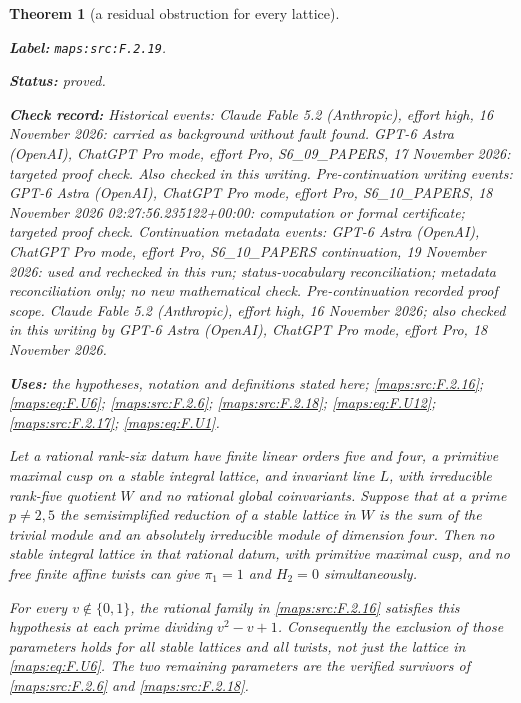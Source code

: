 \documentclass[11pt,a4paper]{article}
\newtheorem{theorem}{Theorem}[section]
\theoremstyle{definition}
\newcommand{\StatementRecord}[4]{\par\smallskip\begingroup\upshape\raggedright\noindent\textbf{Label:} \nolinkurl{#1}.\par\noindent\textbf{Status:} #2.\par\noindent\textbf{Check record:} #3.\par\noindent\textbf{Uses:} #4.\par\endgroup\smallskip}
\begin{document}
\begin{theorem}[a residual obstruction for every lattice]\label{maps:src:F.2.19}
\StatementRecord{maps:src:F.2.19}{proved}{Historical events: Claude Fable 5.2 (Anthropic), effort high, 16 November 2026: carried as background without fault found. GPT-6 Astra (OpenAI), ChatGPT Pro mode, effort Pro, S6\_09\_PAPERS, 17 November 2026: targeted proof check. Also checked in this writing. Pre-continuation writing events: GPT-6 Astra (OpenAI), ChatGPT Pro mode, effort Pro, S6\_10\_PAPERS, 18 November 2026 02:27:56.235122+00:00: computation or formal certificate; targeted proof check. Continuation metadata events: GPT-6 Astra (OpenAI), ChatGPT Pro mode, effort Pro, S6\_10\_PAPERS continuation, 19 November 2026: used and rechecked in this run; status-vocabulary reconciliation; metadata reconciliation only; no new mathematical check. \emph{Pre-continuation recorded proof scope.} Claude Fable 5.2 (Anthropic), effort high, 16 November 2026; also checked in this writing by GPT-6 Astra (OpenAI), ChatGPT Pro mode, effort Pro, 18 November 2026}{the hypotheses, notation and definitions stated here; \cref{maps:src:F.2.16}; \cref{maps:eq:F.U6}; \cref{maps:src:F.2.6}; \cref{maps:src:F.2.18}; \cref{maps:eq:F.U12}; \cref{maps:src:F.2.17}; \cref{maps:eq:F.U1}}


Let a rational rank-six datum have finite linear orders five
and four, a primitive maximal cusp on a stable integral lattice,
and invariant line $L$, with irreducible rank-five quotient $W$
and no rational global coinvariants.  Suppose that at a prime
$p\ne2,5$ the semisimplified reduction of a stable lattice in
$W$ is the sum of the trivial module and an absolutely
irreducible module of dimension four.  Then no stable integral
lattice in that rational datum, with primitive maximal cusp,
and no free finite affine twists can give
$\pi_1=1$ and $H_2=0$ simultaneously.

For every $v\notin\{0,1\}$, the rational family in \ref{maps:src:F.2.16}
satisfies this hypothesis at each prime dividing
$v^2-v+1$.  Consequently the exclusion of those parameters
holds for \emph{all} stable lattices and all twists, not just
the lattice in \eqref{maps:eq:F.U6}.  The two remaining parameters are the
verified survivors of \ref{maps:src:F.2.6} and \ref{maps:src:F.2.18}.

\end{theorem}
\end{document}
